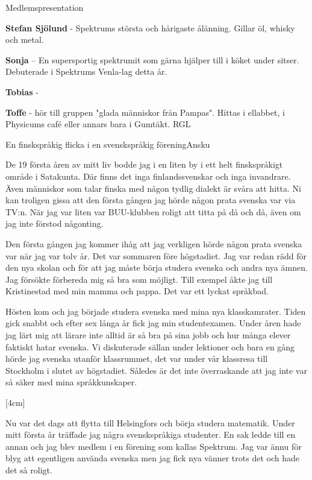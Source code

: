 \documentclass{spektraklet}
\begin{document}
\begin{artikel}{Medlemspresentation}{}
\begin{twocolumns}
\textbf{Stefan Sjölund} - Spektrums största och hårigaste ålänning. Gillar öl, whisky och metal.

\textbf{Sonja} – En supersportig spektrumit som gärna hjälper till i köket under sitser. Debuterade i Spektrums Venla-lag detta år.

\textbf{Tobias} -

\textbf{Toffe} - hör till gruppen "glada människor från Pampas". Hittas i ellabbet, i Physicums café eller annars bara i Gumtäkt. RGL





\end{twocolumns}
\end{artikel}




\begin{artikel}{En finskspråkig flicka i en svenskspråkig förening}{Ansku}
\begin{twocolumns}

De 19 första åren av mitt liv bodde jag i en liten by i ett helt finskspråkigt område i Satakunta. Där finns det inga finlandssvenskar och inga invandrare. Även människor som talar finska med någon tydlig dialekt är svåra att hitta. Ni kan troligen gissa att den första gången jag hörde någon prata svenska var via TV:n. När jag var liten var BUU-klubben roligt att titta på då och då, även om jag inte förstod någonting.
 
Den första gången jag kommer ihåg att jag verkligen hörde någon prata svenska var när jag var tolv år. Det var sommaren före högstadiet. Jag var redan rädd för den nya skolan och för att jag måste börja studera svenska och andra nya ämnen. Jag försökte förbereda mig så bra som möjligt. Till exempel åkte jag till Kristinestad med min mamma och pappa. Det var ett lyckat språkbad.

Hösten kom och jag började studera svenska med mina nya klasskamrater. Tiden gick snabbt och efter sex långa år fick jag min studentexamen. Under åren hade jag lärt mig att lärare inte alltid är så bra på sina jobb och hur många elever faktiskt hatar svenska. Vi diskuterade sällan under lektioner och bara en gång hörde jag svenska utanför klassrummet, det var under vår klassresa till Stockholm i slutet av högstadiet. Således är det inte överraskande att jag inte var så säker med mina språkkunskaper.

[4cm]

Nu var det dags att flytta till Helsingfors och börja studera matematik. Under mitt första år träffade jag några svenskspråkiga studenter. En sak ledde till en annan och jag blev medlem i en förening som kallas Spektrum. Jag var ännu för blyg att egentligen använda svenska men jag fick nya vänner trots det och hade det så roligt.


\end{twocolumns}
\end{artikel}
\end{document}
